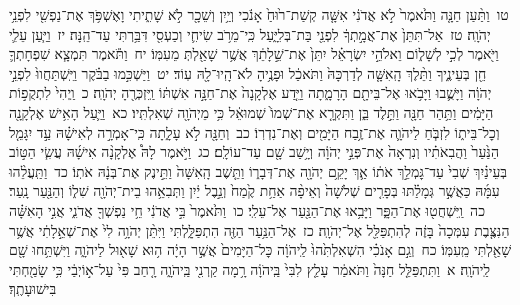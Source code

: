 \documentclass[18pt]{article}
\newcommand{\vart}[1]{\Bfootnote{#1}}	%
\begin{document}
 {\loc טו~}וַתַּ֨עַן חַנָּ֤ה וַתֹּ֙אמֶר֙ לֹ֣א אֲדֹנִ֔י אִשָּׁ֤ה קְשַׁת־ר֙וּחַ֙ אָנֹ֔כִי וְיַ֥יִן וְשֵׁכָ֖ר לֹ֣א שָׁתִ֑יתִי וָאֶשְׁפֹּ֥ךְ אֶת־נַפְשִׁ֖י לִפְנֵ֥י יְהֹוָֽה׃ \startlock
 {\loc טז~}אַל־תִּתֵּן֙ אֶת־אֲמָ֣תְךָ֔ לִפְנֵ֖י בַּת־בְּלִיָּ֑עַל כִּֽי־מֵרֹ֥ב שִׂיחִ֛י וְכַעְסִ֖י דִּבַּ֥רְתִּי עַד־הֵֽנָּה׃ \startlock
 {\loc יז~}וַיַּ֧עַן עֵלִ֛י וַיֹּ֖אמֶר לְכִ֣י לְשָׁל֑וֹם וֵאלֹהֵ֣י יִשְׂרָאֵ֗ל יִתֵּן֙ אֶת־שֵׁ֣לָתֵ֔ךְ אֲשֶׁ֥ר שָׁאַ֖לְתְּ מֵעִמּֽוֹ׃ \startlock
 {\loc יח~}וַתֹּ֕אמֶר תִּמְצָ֧א שִׁפְחָתְךָ֛ חֵ֖ן בְּעֵינֶ֑יךָ וַתֵּ֨לֶךְ הָֽאִשָּׁ֤ה לְדַרְכָּהּ֙ וַתֹּאכַ֔ל וּפָנֶ֥יהָ לֹא־הָֽיוּ־לָ֖הּ עֽוֹד׃ \startlock
 {\loc יט~}וַיַּשְׁכִּ֣מוּ בַבֹּ֗קֶר וַיִּֽשְׁתַּחֲווּ֙ לִפְנֵ֣י יְהֹוָ֔ה וַיָּשֻׁ֛בוּ וַיָּבֹ֥אוּ אֶל־בֵּיתָ֖ם הָרָמָ֑תָה וַיֵּ֤דַע אֶלְקָנָה֙ אֶת־חַנָּ֣ה אִשְׁתּ֔וֹ וַֽיִּזְכְּרֶ֖הָ יְהֹוָֽה׃ \startlock
 {\loc כ~}וַֽיְהִי֙ לִתְקֻפ֣וֹת הַיָּמִ֔ים וַתַּ֥הַר חַנָּ֖ה וַתֵּ֣לֶד בֵּ֑ן וַתִּקְרָ֤א אֶת־שְׁמוֹ֙ שְׁמוּאֵ֔ל כִּ֥י מֵיְהֹוָ֖ה שְׁאִלְתִּֽיו׃ \startlock
 {\loc כא~}וַיַּ֛עַל הָאִ֥ישׁ אֶלְקָנָ֖ה וְכׇל־בֵּית֑וֹ לִזְבֹּ֧חַ לַיהֹוָ֛ה אֶת־זֶ֥בַח הַיָּמִ֖ים וְאֶת־נִדְרֽוֹ׃ \startlock
 {\loc כב~}וְחַנָּ֖ה לֹ֣א עָלָ֑תָה כִּֽי־אָמְרָ֣ה לְאִישָׁ֗הּ עַ֣ד יִגָּמֵ֤ל הַנַּ֙עַר֙ וַהֲבִאֹתִ֗יו וְנִרְאָה֙ אֶת־פְּנֵ֣י יְהֹוָ֔ה וְיָ֥שַׁב שָׁ֖ם עַד־עוֹלָֽם׃ \startlock
 {\loc כג~}וַיֹּ֣אמֶר לָהּ֩ אֶלְקָנָ֨ה אִישָׁ֜הּ עֲשִׂ֧י הַטּ֣וֹב בְּעֵינַ֗יִךְ שְׁבִי֙ עַד־גׇּמְלֵ֣ךְ אֹת֔וֹ אַ֛ךְ יָקֵ֥ם יְהֹוָ֖ה אֶת־דְּבָר֑וֹ וַתֵּ֤שֶׁב הָֽאִשָּׁה֙ וַתֵּ֣ינֶק אֶת־בְּנָ֔הּ  \edtext{עַד־גׇּמְלָ֖הּ}{\vart{=א | מ"מ=עַד־גָמְלָ֖הּ (!) | }}  אֹתֽוֹ׃ \startlock
 {\loc כד~}וַתַּֽעֲלֵ֨הוּ עִמָּ֜הּ כַּאֲשֶׁ֣ר גְּמָלַ֗תּוּ בְּפָרִ֤ים שְׁלֹשָׁה֙ וְאֵיפָ֨ה אַחַ֥ת קֶ֙מַח֙ וְנֵ֣בֶל יַ֔יִן וַתְּבִאֵ֥הוּ בֵית־יְהֹוָ֖ה שִׁל֑וֹ וְהַנַּ֖עַר נָֽעַר׃ \startlock
 {\loc כה~}וַֽיִּשְׁחֲט֖וּ אֶת־הַפָּ֑ר וַיָּבִ֥אוּ אֶת־הַנַּ֖עַר אֶל־עֵלִֽי׃ \startlock
 {\loc כו~}וַתֹּ֙אמֶר֙ בִּ֣י אֲדֹנִ֔י חֵ֥י נַפְשְׁךָ֖ אֲדֹנִ֑י אֲנִ֣י הָאִשָּׁ֗ה הַנִּצֶּ֤בֶת עִמְּכָה֙ בָּזֶ֔ה לְהִתְפַּלֵּ֖ל אֶל־יְהֹוָֽה׃ \startlock
 {\loc כז~}אֶל־הַנַּ֥עַר הַזֶּ֖ה הִתְפַּלָּ֑לְתִּי וַיִּתֵּ֨ן יְהֹוָ֥ה לִי֙ אֶת־שְׁאֵ֣לָתִ֔י אֲשֶׁ֥ר שָׁאַ֖לְתִּי מֵֽעִמּֽוֹ׃ \startlock
 {\loc כח~}וְגַ֣ם אָנֹכִ֗י הִשְׁאִלְתִּ֙הוּ֙ לַֽיהֹוָ֔ה כׇּל־הַיָּמִים֙ אֲשֶׁ֣ר הָיָ֔ה ה֥וּא שָׁא֖וּל לַיהֹוָ֑ה וַיִּשְׁתַּ֥חוּ שָׁ֖ם לַֽיהֹוָֽה׃ 
\startlock
 {\loc א~}וַתִּתְפַּלֵּ֤ל חַנָּה֙ וַתֹּאמַ֔ר עָלַ֤ץ לִבִּי֙ בַּֽיהֹוָ֔ה רָ֥מָה קַרְנִ֖י בַּֽיהֹוָ֑ה רָ֤חַב פִּי֙ עַל־א֣וֹיְבַ֔י כִּ֥י שָׂמַ֖חְתִּי בִּישׁוּעָתֶֽךָ׃ \startlock
\end{document}
